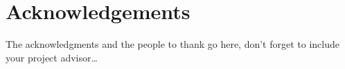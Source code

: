 
\chapter*{Acknowledgements}


	
\blindtext

\blindtext
\blindtext
\blindtext




The acknowledgments and the people to thank go here, don't forget to include your project advisor\ldots